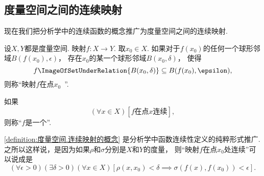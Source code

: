 \subsection{度量空间之间的连续映射}
现在我们把分析学中的连续函数的概念推广为度量空间之间的连续映射.

\begin{definition}\label{definition:度量空间.连续映射的概念}
设\(X,Y\)都是度量空间.
映射\(f\colon X \to Y\).
取\(x_0 \in X\).
如果对于\(f(x_0)\)的任何一个球形邻域\(B(f(x_0),\epsilon)\)，
存在\(x_0\)的某一个球形邻域\(B(x_0,\delta)\)，
使得\[
	f\ImageOfSetUnderRelation{B(x_0,\delta)}
	\subseteq
	B(f(x_0),\epsilon),
\]
则称“映射\(f\)在点\(x_0\)~”.

如果\[
	(\forall x \in X)
	[\text{\(f\)在点\(x\)连续}],
\]
则称“\(f\)是一个”.
\end{definition}
\cref{definition:度量空间.连续映射的概念} 是分析学中函数连续性定义的纯粹形式推广.
之所以这样说，是因为如果\(\rho\)和\(\sigma\)分别是\(X\)和\(Y\)的度量，
则“映射\(f\)在点\(x_0\)处连续”可以说成是\[
	(\forall\epsilon>0)
	(\exists\delta>0)
	(\forall x \in X)
	[
		\rho(x,x_0)<\delta
		\implies
		\sigma(f(x),f(x_0))<\epsilon
	].
\]

